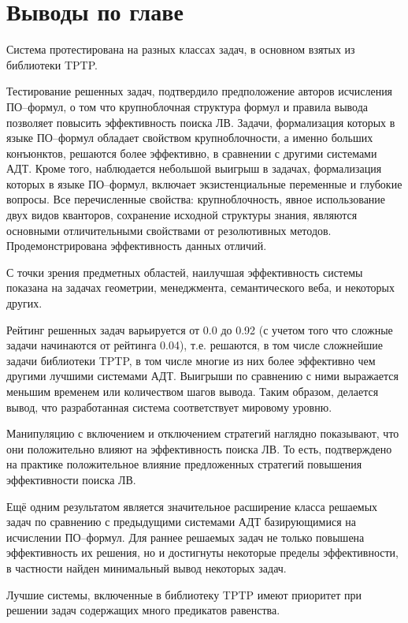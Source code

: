 \section{Выводы по главе}
Система протестирована на разных классах задач, в основном взятых из библиотеки TPTP.

Тестирование решенных задач, подтвердило предположение авторов исчисления ПО--формул, о том что крупноблочная структура формул и правила вывода позволяет повысить эффективность поиска ЛВ. Задачи, формализация которых в языке ПО--формул обладает свойством крупноблочности, а именно больших конъюнктов, решаются более эффективно, в сравнении с другими системами АДТ. Кроме того, наблюдается небольшой выигрыш в задачах, формализация которых в языке ПО--формул, включает экзистенциальные переменные и глубокие вопросы. Все перечисленные свойства: крупноблочность, явное использование двух видов кванторов, сохранение исходной структуры знания, являются основными отличительными свойствами от резолютивных методов. Продемонстрирована эффективность данных отличий.

С точки зрения предметных областей, наилучшая эффективность системы показана на задачах геометрии, менеджмента, семантического веба, и некоторых других.

Рейтинг решенных задач варьируется от 0.0 до 0.92 (с учетом того что сложные задачи начинаются от рейтинга 0.04), т.е. решаются, в том числе сложнейшие задачи библиотеки TPTP, в том числе многие из них более эффективно чем другими лучшими системами АДТ. Выигрыши по сравнению с ними выражается меньшим временем или количеством шагов вывода. Таким образом, делается вывод, что разработанная система соответствует мировому уровню.

Манипуляцию с включением и отключением стратегий наглядно показывают, что они положительно влияют на эффективность поиска ЛВ. То есть, подтверждено на практике положительное влияние предложенных стратегий повышения эффективности поиска ЛВ.

Ещё одним результатом является значительное расширение класса решаемых задач по сравнению с предыдущими системами АДТ базирующимися на исчислении ПО--формул. Для раннее решаемых задач не только повышена эффективность их решения, но и достигнуты некоторые пределы эффективности, в частности найден минимальный вывод некоторых задач.

Лучшие системы, включенные в библиотеку TPTP имеют приоритет при решении задач содержащих много предикатов равенства.




